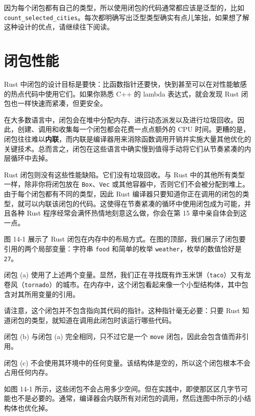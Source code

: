 因为每个闭包都有自己的类型，所以使用闭包的代码通常都应该是泛型的，比如 \texttt{count\_selected\_cities}。每次都明确写出泛型类型确实有点儿笨拙，如果想了解这种设计的优点，请继续往下阅读。

\section{闭包性能}

Rust 中闭包的设计目标是要快：比函数指针还要快，快到甚至可以在对性能敏感的热点代码中使用它们。如果你熟悉 C++ 的 lambda 表达式，就会发现 Rust 闭包也一样快速而紧凑，但更安全。

在大多数语言中，闭包会在堆中分配内存、进行动态派发以及进行垃圾回收。因此，创建、调用和收集每一个闭包都会花费一点点额外的 CPU 时间。更糟的是，闭包往往难以\textbf{内联}，而内联是编译器用来消除函数调用开销并实施大量其他优化的关键技术。总而言之，闭包在这些语言中确实慢到值得手动将它们从节奏紧凑的内层循环中去掉。

Rust 闭包则没有这些性能缺陷。它们没有垃圾回收。与 Rust 中的其他所有类型一样，除非你将闭包放在 \texttt{Box}、\texttt{Vec} 或其他容器中，否则它们不会被分配到堆上。由于每个闭包都有不同的类型，因此 Rust 编译器只要知道你正在调用的闭包的类型，就可以内联该闭包的代码。这使得在节奏紧凑的循环中使用闭包成为可能，并且各种 Rust 程序经常会满怀热情地刻意这么做，你会在第 15 章中亲自体会到这一点。

图 14-1 展示了 Rust 闭包在内存中的布局方式。在图的顶部，我们展示了闭包要引用的两个局部变量：字符串 \texttt{food} 和简单的枚举 \texttt{weather}，枚举的数值恰好是 \texttt{27}。


闭包 (a) 使用了上述两个变量。显然，我们正在寻找既有炸玉米饼（\texttt{taco}）又有龙卷风（\texttt{tornado}）的城市。在内存中，这个闭包看起来像一个小型结构体，其中包含对其所用变量的引用。

请注意，这个闭包并不包含指向其代码的指针。这种指针毫无必要：只要 Rust 知道闭包的类型，就知道在调用此闭包时该运行哪些代码。

闭包 (b) 与闭包 (a) 完全相同，只不过它是一个 \texttt{move} 闭包，因此会包含值而非引用。

闭包 (c) 不会使用其环境中的任何变量。该结构体是空的，所以这个闭包根本不会占用任何内存。

如图 14-1 所示，这些闭包不会占用多少空间。但在实践中，即使那区区几字节可能也不是必要的。通常，编译器会内联所有对闭包的调用，然后连图中所示的小结构体也优化掉。


